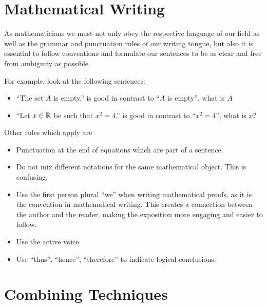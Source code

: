 \section{Mathematical Writing}

As mathematicians we must not only obey the respective language of our field as well as the grammar and punctuation rules of
our writing tongue, but also it is essential to follow conventions and formulate our sentences to be as clear and free from ambiguity as possible.

For example, look at the following sentences:

\begin{itemize}

	\item ``The set \(A\) is empty.'' is good in contrast to ``\(A\) is empty'', what is \(A\)

	\item ``Let \(x \in \mathbb{R}\) be such that \(x^2 = 4\).'' is good in contrast to ``\(x^2 = 4\)'', what is \(x\)?

\end{itemize}

Other rules which apply are

\begin{itemize}

	\item  Punctuation at the end of equations which are part of a sentence.

	\item Do not mix different notations for the same mathematical object. This is confusing.

	\item Use the first person plural ``we'' when writing mathematical proofs, as it is the convention in mathematical writing. This
	      creates a connection between the author and the reader, making the exposition more engaging and easier to follow.

	\item Use the active voice.

	\item Use ``thus'', ``hence'', ``therefore'' to indicate logical conclusions.

\end{itemize}

\section{Combining Techniques}

